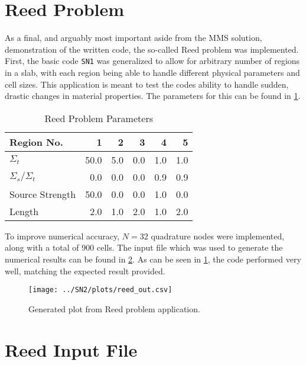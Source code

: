 \documentclass{NE515}
\theoremstyle{definition}
\begin{document}
    \section{Reed Problem}
    As a final, and arguably most important aside from the MMS solution, demonstration of the written code, the so-called Reed problem was implemented.
    First, the basic code \texttt{SN1} was generalized to allow for arbitrary number of regions in a slab, with each region being able to handle different physical parameters and cell sizes.
    This application is meant to test the codes ability to handle sudden, drastic changes in material properties.
    The parameters for this can be found in \cref{tab:reed-params}.
    \begin{table}
        \centering
        \begin{tabular}{lrrrrr}
            \toprule
            \textbf{Region No.}   & \textbf{1} & \textbf{2} & \textbf{3} & \textbf{4} & \textbf{5} \\
            \midrule
            $\Sigma_t$            & 50.0       & 5.0        & 0.0        & 1.0        & 1.0        \\
            $\Sigma_{s}/\Sigma_t$ & 0.0        & 0.0        & 0.0        & 0.9        & 0.9        \\
            Source Strength       & 50.0       & 0.0        & 0.0        & 1.0        & 0.0        \\
            Length                & 2.0        & 1.0        & 2.0        & 1.0        & 2.0        \\
            \bottomrule
        \end{tabular}
        \caption{Reed Problem Parameters}
        \label{tab:reed-params}
    \end{table}

    To improve numerical accuracy, $N=32$ quadrature nodes were implemented, along with a total of 900 cells.
    The input file which was used to generate the numerical results can be found in \cref{sec:reed-input-file}.
    As can be seen in \cref{fig:reed-figure}, the code performed very well, matching the expected result provided.


    \begin{figure}[!htb]
        \centering
        \texttt{[image: ../SN2/plots/reed\_out.csv]}
        \caption{Generated plot from Reed problem application.}
        \label{fig:reed-figure}
    \end{figure}
    
    \appendix
    \section{Reed Input File}\label{sec:reed-input-file}
    \inputminted[linenos, bgcolor=LightGray, fontsize=\footnotesize]{text}{../SN2/reed_input.txt}
    
    
\end{document}
